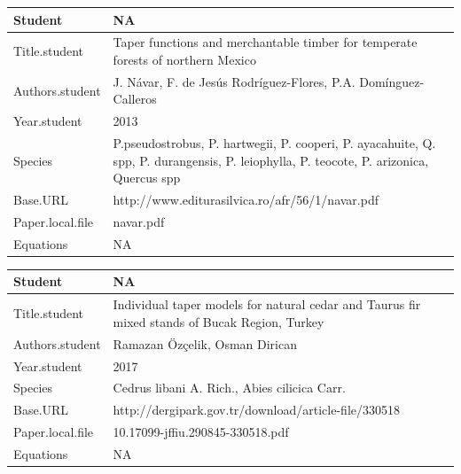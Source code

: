 \documentclass[]{article}
\begin{document}
\begin{tabular}{p{} p{}}
\hline
Student & NA \\ \hline
Title.student & Taper functions and merchantable timber for temperate forests of northern Mexico \\ \hline
Authors.student & J. Návar, F. de Jesús Rodríguez-Flores, P.A. Domínguez-Calleros \\ \hline
Year.student & 2013 \\ \hline
Species & P.pseudostrobus, P. hartwegii, P. cooperi, P. ayacahuite, Q. spp, P. durangensis, P. leiophylla, P. teocote, P. arizonica, Quercus spp \\ \hline
Base.URL & http://www.editurasilvica.ro/afr/56/1/navar.pdf \\ \hline
Paper.local.file & navar.pdf \\ \hline
Equations & NA \\ \hline
\end{tabular}

\begin{tabular}{p{} p{}}
\hline
Student & NA \\ \hline
Title.student & Individual taper models for natural cedar and Taurus fir mixed stands of Bucak Region, Turkey \\ \hline
Authors.student & Ramazan Özçelik, Osman Dirican \\ \hline
Year.student & 2017 \\ \hline
Species & Cedrus libani A. Rich., Abies cilicica Carr. \\ \hline
Base.URL & http://dergipark.gov.tr/download/article-file/330518 \\ \hline
Paper.local.file & 10.17099-jffiu.290845-330518.pdf \\ \hline
Equations & NA \\ \hline
\end{tabular}
\end{document}
